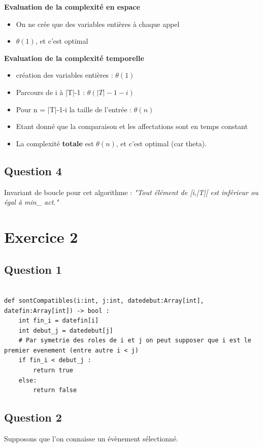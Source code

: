 \documentclass{article}
\begin{document}
\textbf{Evaluation de la complexité en espace}
\begin{itemize}
    \item On ne crée que des variables entières à chaque appel
    \item $ \theta(1) $, et c'est optimal
\end{itemize}


\textbf{Evaluation de la complexité temporelle}
\begin{itemize}
    \item création des variables entières : $ \theta(1) $
    \item Parcours de i à |T|-1 : $ \theta(|T|-1-i) $
    \item Pour n = |T|-1-i la taille de l'entrée : $ \theta(n) $
    \item Etant donné que la comparaison et les affectations sont en temps constant 
    \item La complexité \textbf{ totale } est $\theta(n)$, et c'est optimal (car theta).
\end{itemize}

\subsection*{Question 4}

Invariant de boucle pour cet algorithme : 
\textit{"Tout élément de [i,|T|[ est inférieur ou égal à min\_ act."}

\section*{\textbf{Exercice 2}}

\subsection*{Question 1}

\begin{lstlisting}[label=Python, caption={sontCompatibles}]

def sontCompatibles(i:int, j:int, datedebut:Array[int], datefin:Array[int]) -> bool : 
    int fin_i = datefin[i]
    int debut_j = datedebut[j]
    # Par symetrie des roles de i et j on peut supposer que i est le premier evenement (entre autre i < j)
    if fin_i < debut_j : 
        return true
    else:
        return false

\end{lstlisting}

\subsection*{Question 2}
Supposons que l'on connaisse un évènement sélectionné. 
\end{document}
